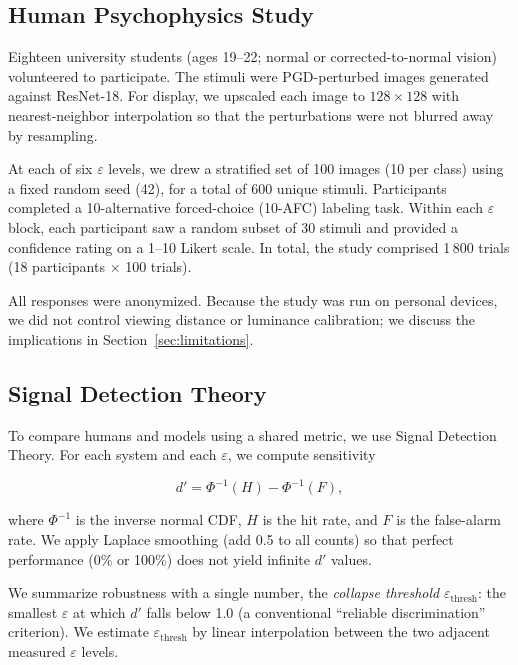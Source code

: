 \documentclass[12pt,a4paper]{article}
\begin{document}
\subsection{Human Psychophysics Study}

Eighteen university students (ages 19--22; normal or corrected-to-normal
vision) volunteered to participate. The stimuli were PGD-perturbed images
generated against ResNet-18. For display, we upscaled each image to
$128{\times}128$ with nearest-neighbor interpolation so that the perturbations
were not blurred away by resampling.

At each of six $\varepsilon$ levels, we drew a stratified set of 100 images (10
per class) using a fixed random seed (42), for a total of 600 unique stimuli.
Participants completed a 10-alternative forced-choice (10-AFC) labeling task.
Within each $\varepsilon$ block, each participant saw a random subset of 30
stimuli and provided a confidence rating on a 1--10 Likert scale. In total, the
study comprised 1\,800 trials (18 participants $\times$ 100 trials).

All responses were anonymized. Because the study was run on personal devices,
we did not control viewing distance or luminance calibration; we discuss the
implications in Section~\ref{sec:limitations}.

\subsection{Signal Detection Theory}

To compare humans and models using a shared metric, we use Signal Detection
Theory. For each system and each $\varepsilon$, we compute sensitivity

\begin{equation}
  d' = \Phi^{-1}(H) - \Phi^{-1}(F),
  \label{eq:dprime}
\end{equation}

where $\Phi^{-1}$ is the inverse normal CDF, $H$ is the hit rate, and $F$ is the
false-alarm rate. We apply Laplace smoothing (add 0.5 to all counts) so that
perfect performance (0\% or 100\%) does not yield infinite $d'$ values.

We summarize robustness with a single number, the \emph{collapse threshold}
$\varepsilon_{\text{thresh}}$: the smallest $\varepsilon$ at which $d'$ falls
below 1.0 (a conventional ``reliable discrimination'' criterion). We estimate
$\varepsilon_{\text{thresh}}$ by linear interpolation between the two adjacent
measured $\varepsilon$ levels.
\end{document}
